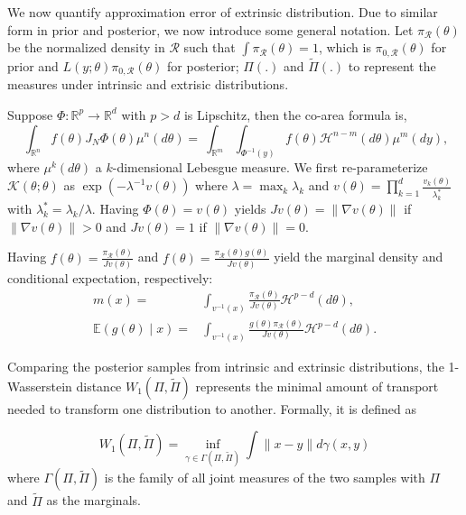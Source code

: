 \documentclass[10pt]{article}
\newcommand{\mc}[1]{\mathcal{#1}}
\DeclareMathOperator{\1}{\mathbbm{1}}
\begin{document}
We now quantify approximation error of extrinsic distribution. Due to similar form in prior and posterior, we now introduce some general notation. Let $\pi_{\mc R}(\theta)$ be the normalized density in $\mc R$ such that $\int \pi_{\mc R}(\theta)=1$, which is $\pi_{0,\mc R}(\theta)$ for prior and $L(y;\theta)\pi_{0,\mc R}(\theta)$ for posterior; $\Pi(.)$ and $\tilde\Pi(.)$ to represent the measures under intrinsic and extrisic distributions. 

Suppose $\Phi:\mathbb R^p \rightarrow \mathbb R^d$ with $p>d$ is Lipschitz, then the co-area formula \citep{federer2014geometric} is,
	\begin{equation}
\ \int_{\mathbb{R}^n}  f(\theta)J_N\Phi(\theta)\mu^n(d \theta)
	=\ \int_{\mathbb{R}^m}  \int_{\Phi^{-1}(y)}f(\theta) \mc H^{n-m}(d\theta)\mu^m(d y),
	\end{equation}
where $\mu^k(d\theta)$ a $k$-dimensional Lebesgue measure. We first re-parameterize $\mc K(\theta;\theta)$ as $\exp(-\lambda^{-1}  v(\theta))$ where $\lambda=\max_k \lambda_k$ and $v(\theta)=\prod_{k=1}^d\frac{v_k(\theta)}{\lambda^*_k}$ with $\lambda^*_k=\lambda_k/\lambda$. Having $\Phi(\theta)=v(\theta)$ yields $J v(\theta)=\|\nabla v(\theta)\|$ if $\|\nabla v(\theta)\|>0$ and $J v(\theta)=1$ if $\|\nabla v(\theta)\|=0$.

Having $f(\theta)=\frac{\pi_{\mc R}(\theta)}{J v(\theta)}$ and $f(\theta)=\frac{\pi_{\mc R}(\theta)g(\theta)}{J v(\theta)}$ yield the marginal density and conditional expectation, respectively:
\begin{equation}
	\begin{aligned}
m(x)= & \int_{v^{-1}(x)} \frac{ \pi_{\mc R}(\theta) }{ J v(\theta) } \mathcal{H}^{p-d}(d \theta),\\
\mathbb{E}(g(\theta) \mid x)= & \int_{v^{-1}(x)} \frac{ g(\theta) \pi_{\mc R}(\theta)}{ J v(\theta) } \mathcal{H}^{p-d}(d \theta).
		\end{aligned}
\end{equation}

Comparing the posterior samples from intrinsic and extrinsic distributions, the 1-Wasserstein distance $W_1(\Pi,\tilde\Pi)$ represents the minimal amount of transport needed to transform one distribution to another. Formally, it is defined as

$$W_1(\Pi,\tilde\Pi)=\underset{\gamma\in \Gamma(\Pi,\tilde\Pi)}{\inf}\int \|x-y\| d\gamma(x,y)$$ 
where $\Gamma(\Pi,\tilde\Pi)$ is the family of all joint measures of the two samples with $\Pi$ and $\tilde\Pi$ as the marginals.
\end{document}
